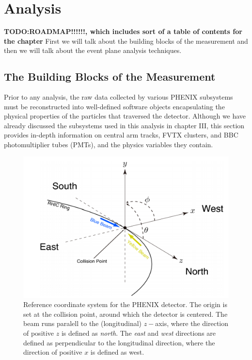 \chapter{Analysis}

\textbf{TODO:ROADMAP!!!!!!, which includes sort of a table of contents for the chapter}
First we will talk about the building blocks of the measurement and then we will talk about the event plane analysis techniques.
\section{The Building Blocks of the Measurement}
Prior to any analysis, the raw data collected by various PHENIX subsystems must be reconstructed into well-defined software objects encapsulating the physical properties of the particles that traversed the detector. Although we have already discussed the subsystems used in this analysis in chapter III, this section provides in-depth information on central arm tracks, FVTX clusters, and BBC photomultiplier tubes (PMTs), and the physics variables they contain. 


\begin{figure}[!h]
\begin{center}
\includegraphics[width=0.55\linewidth]{figs/phenix_coord.png}
\caption{Reference coordinate system for the PHENIX detector. The origin is set at the collision point, around which the detector is centered. The beam runs paralell to the (longitudinal) $z-$axis, where the direction of positive $z$ is defined as \emph{north}. The \emph{east} and \emph{west} directions are defined as perpendicular to the longitudinal direction, where the direction of positive $x$ is defined as west.}
\end{center}
\end{figure}


